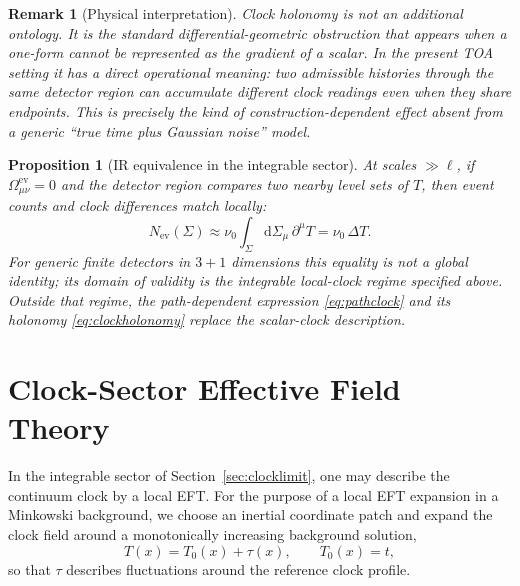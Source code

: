 \documentclass[pdflatex,sn-mathphys-num]{sn-jnl}
\theoremstyle{thmstylethree}
\theoremstyle{thmstyleone}
\newtheorem{proposition}{Proposition}[section]
\theoremstyle{thmstyletwo}
\newtheorem{remark}{Remark}[section]
\numberwithin{equation}{section}
\newcommand{\dd}{\mathrm{d}}
\newcommand{\Sig}{\Sigma}
\newcommand{\Nev}{N_{\mathrm{ev}}}
\begin{document}
    \begin{remark}[Physical interpretation]
        Clock holonomy is not an additional ontology. It is the standard differential-geometric obstruction that appears when a one-form cannot be represented as the gradient of a scalar. In the present TOA setting it has a direct operational meaning: two admissible histories through the same detector region can accumulate different clock readings even when they share endpoints. This is precisely the kind of construction-dependent effect absent from a generic ``true time plus Gaussian noise'' model.
    \end{remark}
    
    \begin{proposition}[IR equivalence in the integrable sector]
        At scales $\gg \ell$, if $\Omega^{\mathrm{ev}}_{\mu\nu}=0$ and the detector region compares two nearby level sets of $T$, then event counts and clock differences match locally:
        \begin{equation}
            \Nev(\Sig)\approx \nu_0\int_\Sig \dd\Sigma_\mu\,\partial^\mu T
            =\nu_0\,\Delta T .
        \end{equation}
        For generic finite detectors in $3+1$ dimensions this equality is not a global identity; its domain of validity is the integrable local-clock regime specified above. Outside that regime, the path-dependent expression \eqref{eq:pathclock} and its holonomy \eqref{eq:clockholonomy} replace the scalar-clock description.
    \end{proposition}

    \section{Clock-Sector Effective Field Theory}\label{sec:clockeft}
    
    In the integrable sector of Section~\ref{sec:clocklimit}, one may describe the continuum clock by a local EFT. For the purpose of a local EFT expansion in a Minkowski background, we choose an inertial coordinate patch and expand the clock field around a monotonically increasing background solution,
    \begin{equation}
        T(x)=T_0(x)+\tau(x), \qquad T_0(x)=t,
    \end{equation}
    so that $\tau$ describes fluctuations around the reference clock profile.
    
\end{document}
